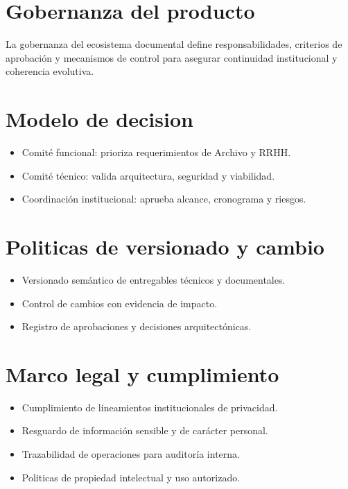 \section{Gobernanza del producto}
La gobernanza del ecosistema documental define responsabilidades, criterios de aprobación y mecanismos de control para asegurar continuidad institucional y coherencia evolutiva.

\section{Modelo de decision}
\begin{itemize}
  \item Comité funcional: prioriza requerimientos de Archivo y RRHH.
  \item Comité técnico: valida arquitectura, seguridad y viabilidad.
  \item Coordinación institucional: aprueba alcance, cronograma y riesgos.
\end{itemize}

\section{Politicas de versionado y cambio}
\begin{itemize}
  \item Versionado semántico de entregables técnicos y documentales.
  \item Control de cambios con evidencia de impacto.
  \item Registro de aprobaciones y decisiones arquitectónicas.
\end{itemize}

\section{Marco legal y cumplimiento}
\begin{itemize}
  \item Cumplimiento de lineamientos institucionales de privacidad.
  \item Resguardo de información sensible y de carácter personal.
  \item Trazabilidad de operaciones para auditoría interna.
  \item Politicas de propiedad intelectual y uso autorizado.
\end{itemize}

